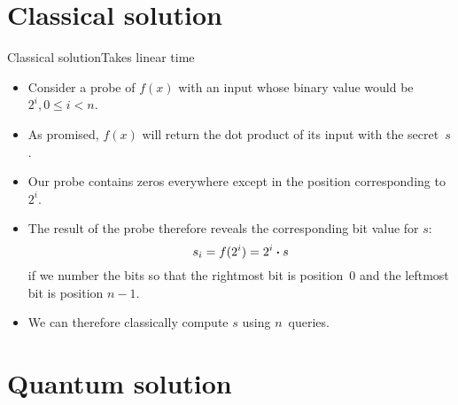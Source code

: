 \section*{Classical solution}

\begin{frame}{Classical solution}{Takes linear time}

\begin{itemize}
    \item Consider a probe of $f(x)$ with an input whose binary value would be~$2^{i}, 0 \leq i < n$.
    \item As promised, $f(x)$ will return the dot product of its input with the secret~$s$.
    \item Our probe contains zeros everywhere except in the position corresponding to~$2^i$.
    \item The result of the probe therefore reveals the corresponding bit value for $s$:
    \[ s_{i} = f(2^{i}) = 2^i\boldsymbol{\cdot}s \]
    if we number the bits so that the rightmost bit is position~$0$ and the leftmost bit is position $n-1$.
    \item We can therefore classically compute $s$ using $n$~queries.
\end{itemize}
    
\end{frame}

\section*{Quantum solution}

